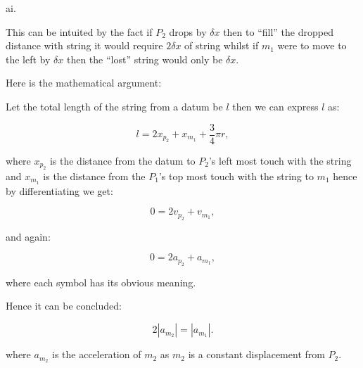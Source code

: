 \documentclass[12pt]{article}
\begin{document}
\begin{center}
    \end{center}

    ai.

    \vspace{12pt}

    This can be intuited by the fact if \(P_2\) drops by \(\delta x\) then to ``fill'' the dropped distance with string it would require \(2\delta x\) of string whilst if \(m_1\) were to move to the left by \(\delta x\) then the ``lost'' string would only be \(\delta x\).
    
    \vspace{12pt}

    Here is the mathematical argument:

    \vspace{12pt}

    Let the total length of the string from a datum be \(l\) then we can express \(l\) as:

    \[l=2x_{p_2}+x_{m_1}+\frac{3}{4}\pi r,\]

    
    where \(x_{p_2}\) is the distance from the datum to \(P_2\)'s left most touch with the string and \(x_{m_1}\) is the distance from the \(P_1\)'s top most touch with the string to \(m_1\) hence by differentiating we get:

    \[0=2v_{p_2}+v_{m_1},\]

    and again:

    \[0=2a_{p_2}+a_{m_1},\]

    where each symbol has its obvious meaning.

    Hence it can be concluded:

    \[2|a_{m_2}|=|a_{m_1}|.\]

    where \(a_{m_2}\) is the acceleration of \(m_2\) as \(m_2\) is a constant displacement from \(P_2\).
\end{document}
